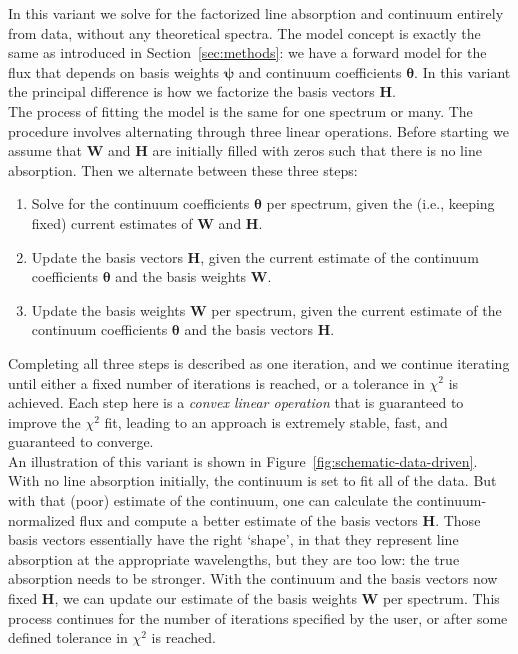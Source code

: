 \documentclass[modern]{aastex631}
\newcommand{\vectheta}{\boldsymbol{\theta}}
\newcommand{\vecpsi}{\boldsymbol{\psi}}
\newcommand{\vecW}{\mathbf{W}}
\newcommand{\vecH}{\mathbf{H}}
\begin{document}
In this variant we solve for the factorized line absorption and continuum entirely from data, without any theoretical spectra. The model concept is exactly the same as introduced in Section~\ref{sec:methods}: we have a forward model for the flux that depends on basis weights $\vecpsi$ and continuum coefficients $\vectheta$. In this variant the principal difference is how we factorize the basis vectors $\vecH$.\\

The process of fitting the model is the same for one spectrum or many. The procedure involves alternating through three linear operations. Before starting we assume that $\vecW$ and $\vecH$ are initially filled with zeros such that there is no line absorption. Then we alternate between these three steps:
\begin{enumerate}
    \item Solve for the continuum coefficients $\vectheta$ per spectrum, given the (i.e., keeping fixed) current estimates of $\vecW$ and $\vecH$.
    \item Update the basis vectors $\vecH$, given the current estimate of the continuum coefficients $\vectheta$ and the basis weights $\vecW$.
    \item Update the basis weights $\vecW$ per spectrum, given the current estimate of the continuum coefficients $\vectheta$ and the basis vectors $\vecH$.
\end{enumerate}
Completing all three steps is described as one iteration, and we continue iterating until either a fixed number of iterations is reached, or a tolerance in $\chi^2$ is achieved. Each step here is a \emph{convex linear operation} that is guaranteed to improve the $\chi^2$ fit, leading to an approach is extremely stable, fast, and guaranteed to converge.\\

An illustration of this variant is shown in Figure~\ref{fig:schematic-data-driven}. With no line absorption initially, the continuum is set to fit all of the data. But with that (poor) estimate of the continuum, one can calculate the continuum-normalized flux and compute a better estimate of the basis vectors $\vecH$. Those basis vectors essentially have the right `shape', in that they represent line absorption at the appropriate wavelengths, but they are too low: the true absorption needs to be stronger. With the continuum and the basis vectors now fixed $\vecH$, we can update our estimate of the basis weights $\vecW$ per spectrum. This process continues for the number of iterations specified by the user, or after some defined tolerance in $\chi^2$ is reached.\\
\end{document}
